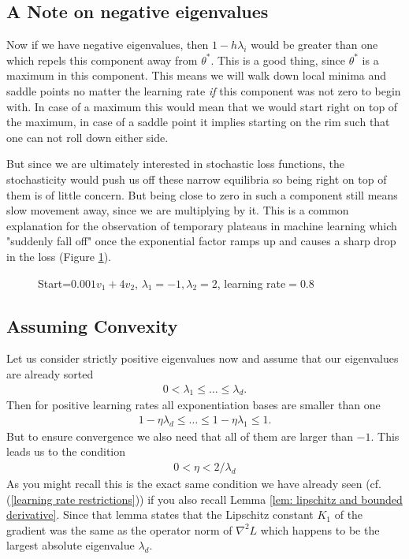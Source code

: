 \subsection{A Note on negative eigenvalues}

Now if we have negative eigenvalues, then \(1-h\lambda_i\) would be greater
than one which repels this component away from \(\theta^*\). This is a good
thing, since \(\theta^*\) is a maximum in this component. This means we will
walk down local minima and saddle points no matter the learning rate \emph{if}
this component was not zero to begin with. In case of a maximum this would mean
that we would start right on top of the maximum, in case of a saddle point
it implies starting on the rim such that one can not roll down either side.

But since we are ultimately interested in stochastic loss functions, the
stochasticity would push us off these narrow equilibria so being right on
top of them is of little concern. But being close to zero in such a component
still means slow movement away, since we are multiplying by it. This is a
common explanation for the observation of temporary plateaus in machine learning
which "suddenly fall off" once the exponential factor ramps up and causes a
sharp drop in the loss (Figure \ref{fig: visualize saddlepoint gd}).

\begin{figure}[h]
	\centering
	\def\svgwidth{1\textwidth}
	
	\caption{Start=\(0.001v_1+4v_2\), \(\lambda_1=-1, \lambda_2=2\), learning rate\(=0.8\)}
	\label{fig: visualize saddlepoint gd}
\end{figure}

\subsection{Assuming Convexity}

Let us consider strictly positive eigenvalues now and assume that our
eigenvalues are already sorted
%
\begin{align}
	0 < \lambda_1 \le \dots \le \lambda_d.
\end{align}
%
Then for positive learning rates all exponentiation bases are smaller than one
%
\begin{align*}
	1-\eta\lambda_d \le \dots \le 1-\eta\lambda_1 \le 1.
\end{align*}
%
But to ensure convergence we also need that all of them are larger than \(-1\).
This leads us to the condition
\begin{align}\label{eq: learning rate restriction (eigenvalue)}
	0< \eta < 2/\lambda_d
\end{align}
As you might recall
 this is the exact same condition we have already seen (cf.
(\ref{learning rate
restrictions})) if you also recall Lemma \ref{lem: lipschitz and bounded
derivative}.
Since that lemma states that the Lipschitz constant \(K_1\) of the gradient was the
same as the operator norm of \(\nabla^2 L\) which happens to be the largest 
absolute eigenvalue \(\lambda_d\).

